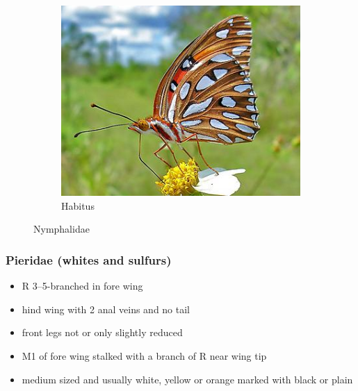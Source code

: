 \documentclass[letterpaper, 11pt]{article}
\begin{document}
\begin{figure}[ht!]
\begin{subfigure}[ht!]{0.5\textwidth}
        \includegraphics[width=\textwidth]{image28}
        \caption{Habitus}
        \label{fig:nymphalid2}
    \end{subfigure}
    \caption{Nymphalidae}\label{fig:nymphalids}
\end{figure}

\subsubsection{Pieridae (whites and sulfurs)}
\begin{itemize}
\item R 3–5-branched in fore wing
\item hind wing with 2 anal veins and no tail
\item front legs not or only slightly reduced
\item M1 of fore wing stalked with a branch of R near wing tip
\item medium sized and usually white, yellow or orange marked with black or plain
\end{itemize}
\end{document}
